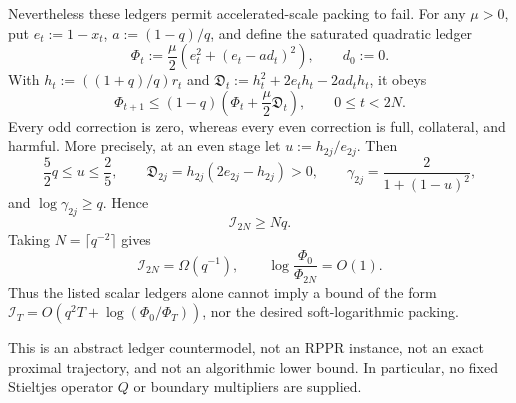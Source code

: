\begin{proposition}
Nevertheless these ledgers permit accelerated-scale packing to fail.  For
any $\mu>0$, put $e_t:=1-x_t$, $a:=(1-q)/q$, and define the saturated
quadratic ledger
\begin{equation}
 \Phi_t:=\frac\mu2\left(e_t^2+(e_t-ad_t)^2\right),
 \qquad d_0:=0.
 \label{eq:aesp-cd-ledger-countermodel-potential}
\end{equation}
With $h_t:=((1+q)/q)r_t$ and
$\mathfrak D_t:=h_t^2+2e_th_t-2ad_th_t$, it obeys
\begin{equation}
 \Phi_{t+1}\leq(1-q)\left(
    \Phi_t+\frac\mu2\mathfrak D_t\right),
 \qquad 0\leq t<2N.
 \label{eq:aesp-cd-ledger-countermodel-defective-contraction}
\end{equation}
Every odd correction is zero, whereas every even correction is full,
collateral, and harmful.  More precisely, at an even stage let
$u:=h_{2j}/e_{2j}$.  Then
\begin{equation}
 \frac52q\leq u\leq\frac25,
 \qquad
 \mathfrak D_{2j}=h_{2j}(2e_{2j}-h_{2j})>0,
 \qquad
 \gamma_{2j}=\frac{2}{1+(1-u)^2},
 \label{eq:aesp-cd-ledger-countermodel-inflation}
\end{equation}
and $\log\gamma_{2j}\geq q$.  Hence
\begin{equation}
 \mathcal I_{2N}\geq Nq.
 \label{eq:aesp-cd-ledger-countermodel-linear-inflation}
\end{equation}
Taking $N=\lceil q^{-2}\rceil$ gives
\begin{equation}
 \mathcal I_{2N}=\Omega(q^{-1}),
 \qquad
 \log\frac{\Phi_0}{\Phi_{2N}}=O(1).
 \label{eq:aesp-cd-ledger-countermodel-stop}
\end{equation}
Thus the listed scalar ledgers alone cannot imply a bound of the form
$\mathcal I_T=O(q^2T+\log(\Phi_0/\Phi_T))$, nor the desired soft-logarithmic
packing.

This is an abstract ledger countermodel, not an RPPR instance, not an exact
proximal trajectory, and not an algorithmic lower bound.  In particular, no
fixed Stieltjes operator $Q$ or boundary multipliers are supplied.
\end{proposition}

